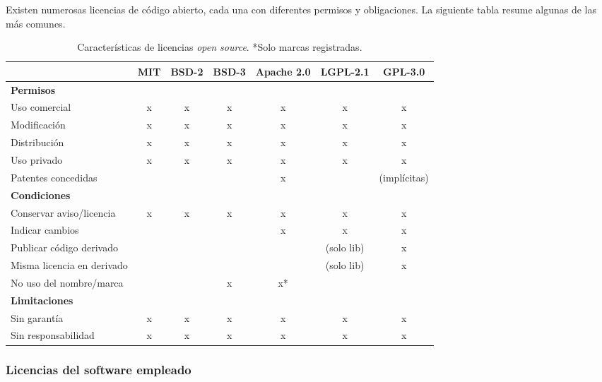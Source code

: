 Existen numerosas licencias de código abierto, cada una con diferentes permisos y obligaciones. La siguiente tabla resume algunas de las más comunes.

\begin{table}[h!]
	\centering
	\begin{adjustbox}{max width=\textwidth}
		\renewcommand{\arraystretch}{1.15}
		\begin{tabular}{|l|c|c|c|c|c|c|}
			\hline
			& MIT & BSD-2 & BSD-3 & Apache 2.0 & LGPL-2.1 & GPL-3.0 \\ \hline \hline
			\multicolumn{7}{|l|}{\textbf{Permisos}} \\ \hline
			Uso comercial                & x & x & x & x & x & x \\ \hline
			Modificación                 & x & x & x & x & x & x \\ \hline
			Distribución                 & x & x & x & x & x & x \\ \hline
			Uso privado                  & x & x & x & x & x & x \\ \hline
			Patentes concedidas          &   &   &   & x &   & (implícitas) \\ \hline \hline
			\multicolumn{7}{|l|}{\textbf{Condiciones}} \\ \hline
			Conservar aviso/licencia     & x & x & x & x & x & x \\ \hline
			Indicar cambios              &   &   &   & x & x & x \\ \hline
			Publicar código derivado     &   &   &   &   & (solo lib) & x \\ \hline
			Misma licencia en derivado   &   &   &   &   & (solo lib) & x \\ \hline
			No uso del nombre/marca      &   &   & x & x* &   &   \\ \hline \hline
			\multicolumn{7}{|l|}{\textbf{Limitaciones}} \\ \hline
			Sin garantía                 & x & x & x & x & x & x \\ \hline
			Sin responsabilidad          & x & x & x & x & x & x \\ \hline
		\end{tabular}
	\end{adjustbox}
	\caption{Características de licencias \textit{open source}. *Solo marcas registradas.}
	\label{tab:licencias_matriz}
\end{table}

\subsubsection{Licencias del software empleado}

